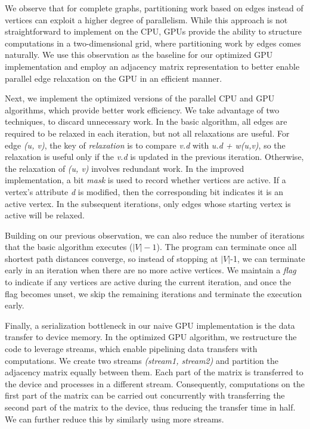 \documentclass[twocolumn]{article}
\begin{document}
We observe that for complete graphs, partitioning work based on edges instead of vertices can exploit a higher degree of parallelism. While this approach is not straightforward to implement on the CPU, GPUs provide the ability to structure computations in a two-dimensional grid, where partitioning work by edges comes naturally. We use this observation as the baseline for our optimized GPU implementation and employ an adjacency matrix representation to better enable parallel edge relaxation on the GPU in an efficient manner.

Next, we implement the optimized versions of the parallel CPU and GPU algorithms, which provide better work efficiency. We take advantage of two techniques, to discard unnecessary work. In the basic algorithm, all edges are required to be relaxed in each iteration, but not all relaxations are useful. For edge \emph{(u, v)}, the key of \emph{relaxation} is to compare \emph{v.d} with \emph{u.d + w(u,v)}, so the relaxation is useful only if the \emph{v.d} is updated in the previous iteration. Otherwise, the relaxation of \emph{(u, v)} involves redundant work. In the improved implementation, a bit \emph{mask} is used to record whether vertices are active. If a vertex's attribute \emph{d} is modified, then the corresponding bit indicates it is an active vertex. In the subsequent iterations, only edges whose starting vertex is active will be relaxed. 

Building on our previous observation, we can also reduce the number of iterations that the basic algorithm executes ($|V|-1$). The program can terminate once all shortest path distances converge, so instead of stopping at $|V|$-1, we can terminate early in an iteration when there are no more active vertices. We maintain a \emph{flag} to indicate if any vertices are active during the current iteration, and once the flag becomes unset, we skip the remaining iterations and terminate the execution early.


Finally, a serialization bottleneck in our naive GPU implementation is the data transfer to device memory. In the optimized GPU algorithm, we restructure the code to leverage streams, which enable pipelining data transfers with computations.
We create two streams \emph{(stream1, stream2)} and partition the adjacency matrix equally between them. Each part of the matrix is transferred to the device and processes in a different stream. Consequently, computations on the first part of the matrix can be carried out concurrently with transferring the second part of the matrix to the device, thus reducing the transfer time in half. We can further reduce this by similarly using more streams.
\end{document}
